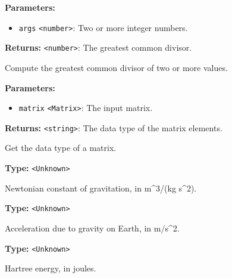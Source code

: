 \documentclass[12pt,a4paper]{article}
\begin{document}
\noindent \textbf{Parameters:}
\begin{itemize}
  \item \texttt{args} \texttt{<number>}: Two or more integer numbers.
\end{itemize}

\noindent \textbf{Returns:} \texttt{<number>}: The greatest common divisor.

\noindent Compute the greatest common divisor of two or more values.

\vspace{5mm}
\noindent {}


\noindent \textbf{Parameters:}
\begin{itemize}
  \item \texttt{matrix} \texttt{<Matrix>}: The input matrix.
\end{itemize}

\noindent \textbf{Returns:} \texttt{<string>}: The data type of the matrix elements.

\noindent Get the data type of a matrix.

\vspace{5mm}
\noindent {}\vspace{4mm}


\noindent \textbf{Type:} \texttt{<Unknown>}

\noindent Newtonian constant of gravitation, in m\textasciicircum{}3/(kg s\textasciicircum{}2).

\vspace{5mm}
\noindent {}\vspace{4mm}


\noindent \textbf{Type:} \texttt{<Unknown>}

\noindent Acceleration due to gravity on Earth, in m/s\textasciicircum{}2.

\vspace{5mm}
\noindent {}\vspace{4mm}


\noindent \textbf{Type:} \texttt{<Unknown>}

\noindent Hartree energy, in joules.
\end{document}
